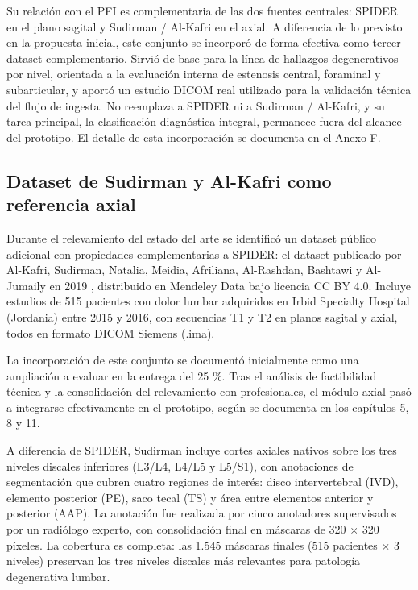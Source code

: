 Su relación con el PFI es complementaria de las dos fuentes centrales: SPIDER en el plano sagital y Sudirman / Al-Kafri en el axial. A diferencia de lo previsto en la propuesta inicial, este conjunto se incorporó de forma efectiva como tercer dataset complementario. Sirvió de base para la línea de hallazgos degenerativos por nivel, orientada a la evaluación interna de estenosis central, foraminal y subarticular, y aportó un estudio DICOM real utilizado para la validación técnica del flujo de ingesta. No reemplaza a SPIDER ni a Sudirman / Al-Kafri, y su tarea principal, la clasificación diagnóstica integral, permanece fuera del alcance del prototipo. El detalle de esta incorporación se documenta en el Anexo F.

\subsection{Dataset de Sudirman y Al-Kafri como referencia axial}

Durante el relevamiento del estado del arte se identificó un dataset público adicional con propiedades complementarias a SPIDER: el dataset publicado por Al-Kafri, Sudirman, Natalia, Meidia, Afriliana, Al-Rashdan, Bashtawi y Al-Jumaily en 2019 \parencite{alkafri_sudirman_boundary_2019}, distribuido en Mendeley Data bajo licencia CC BY 4.0. Incluye estudios de 515 pacientes con dolor lumbar adquiridos en Irbid Specialty Hospital (Jordania) entre 2015 y 2016, con secuencias T1 y T2 en planos sagital y axial, todos en formato DICOM Siemens (.ima).

La incorporación de este conjunto se documentó inicialmente como una ampliación a evaluar en la entrega del 25 \%. Tras el análisis de factibilidad técnica y la consolidación del relevamiento con profesionales, el módulo axial pasó a integrarse efectivamente en el prototipo, según se documenta en los capítulos 5, 8 y 11.

A diferencia de SPIDER, Sudirman incluye cortes axiales nativos sobre los tres niveles discales inferiores (L3/L4, L4/L5 y L5/S1), con anotaciones de segmentación que cubren cuatro regiones de interés: disco intervertebral (IVD), elemento posterior (PE), saco tecal (TS) y área entre elementos anterior y posterior (AAP). La anotación fue realizada por cinco anotadores supervisados por un radiólogo experto, con consolidación final en máscaras de 320 × 320 píxeles. La cobertura es completa: las 1.545 máscaras finales (515 pacientes × 3 niveles) preservan los tres niveles discales más relevantes para patología degenerativa lumbar.

